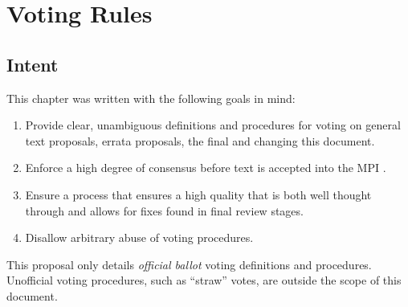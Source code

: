 \chapter{Voting Rules}


\section{Intent}

This chapter was written with the following goals in mind:

\begin{enumerate}
\item Provide clear, unambiguous definitions and procedures for voting
  on general text proposals, errata proposals, the final {\color{red}{MPI Standard Document}} and changing this
  document.
\item Enforce a high degree of consensus before text is accepted into
  the MPI {\color{red}{Standard Document}}.
\item Ensure a process that ensures a high quality {\color{red}{MPI Standard Document}} that is both well thought through and allows for fixes found in final review stages.
\item Disallow arbitrary abuse of voting procedures.
\end{enumerate}

This proposal only details {\em official ballot} voting definitions
and procedures.  Unofficial voting procedures, such as ``straw''
votes, are outside the scope of this document.



